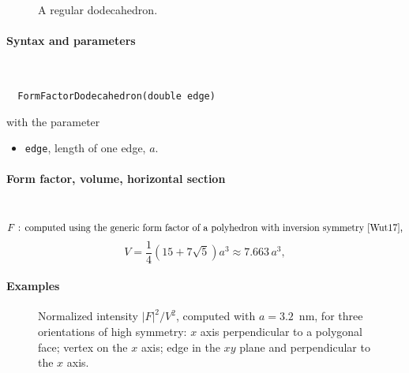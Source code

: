 \begin{figure}[H]
\strut\hfill
{}
\hfill\strut
\caption{A regular dodecahedron.}
\end{figure}

\FloatBarrier

\paragraph{Syntax and parameters}\strut\\[-2ex plus .2ex minus .2ex]
\begin{lstlisting}
  FormFactorDodecahedron(double edge)
\end{lstlisting}
with the parameter
\begin{itemize}
\item \texttt{edge}, length of one edge, $a$.
\end{itemize}

\paragraph{Form factor, volume, horizontal section}\strut\\
\begin{equation*}
  F \text{~: computed using the generic form factor of a polyhedron
             with inversion symmetry~\cite{Wut17},}
\end{equation*}
\begin{equation*}
  V= \frac{1}{4} (15+7\sqrt{5}) a^3 \approx 7.663\,a^3,
\end{equation*}

\paragraph{Examples}\strut

\begin{figure}[H]
\begin{center}
\end{center}
\caption{Normalized intensity $|F|^2/V^2$,
computed with $a=3.2$~nm,
for three orientations of high symmetry:
$x$ axis perpendicular to a polygonal face;
vertex on the $x$ axis;
edge in the $xy$ plane and perpendicular to the $x$ axis.}
\end{figure}

